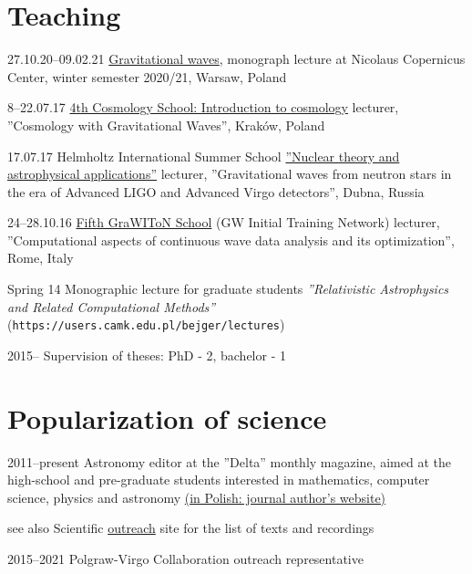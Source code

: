 \documentclass[]{friggeri-cv} %
\begin{document}
\section{Teaching}
\begin{entrylistshort}

\entrys
{27.10.20--09.02.21} 
{\href{https://users.camk.edu.pl/bejger/gw-lecture2020}{Gravitational waves}, monograph lecture at Nicolaus Copernicus Center, winter semester 2020/21, Warsaw, Poland} 

\entrys
{8--22.07.17}
{\href{http://cosmoschool2018.oa.uj.edu.pl}{4th Cosmology School: Introduction to cosmology} lecturer, ''Cosmology with Gravitational Waves'', Kraków, Poland}

\entrys
{17.07.17} 
{Helmholtz International Summer School \href{http://theor.jinr.ru/~ntaa/17}{''Nuclear theory and astrophysical applications''} lecturer, ''Gravitational waves from neutron stars in the era of Advanced LIGO and Advanced Virgo detectors'', Dubna, Russia}  

\entrys
{24--28.10.16}
{\href{https://events.ego-gw.it/indico/conferenceDisplay.py?ovw=True\&confId=44}{Fifth GraWIToN School} (GW Initial Training Network) lecturer, ''Computational aspects of continuous wave data analysis and its optimization'', Rome, Italy}

\entrys
{Spring 14}
{Monographic lecture for graduate students {\it ''Relativistic Astrophysics and Related Computational Methods''} ({\tt https://users.camk.edu.pl/bejger/lectures})} 


\entrys
{2015--} 
{Supervision of theses: PhD - 2, bachelor - 1} 
\end{entrylistshort}



\section{Popularization of science}
\begin{entrylistshort}

\entrys 
{2011--present} 
{Astronomy editor at the ''Delta'' monthly magazine, aimed at the high-school and pre-graduate students interested in mathematics, computer science, physics and astronomy \href{http://www.deltami.edu.pl/delta/autorzy/michal\_bejger}{(in Polish: journal author's website)}} 

\entrys
{see also} 
{Scientific \href{http://users.camk.edu.pl/bejger/outreach/}{outreach} site for the list of texts and recordings} 

\entrys
{2015--2021} 
{Polgraw-Virgo Collaboration outreach representative} 
\end{entrylistshort}
\end{document}
